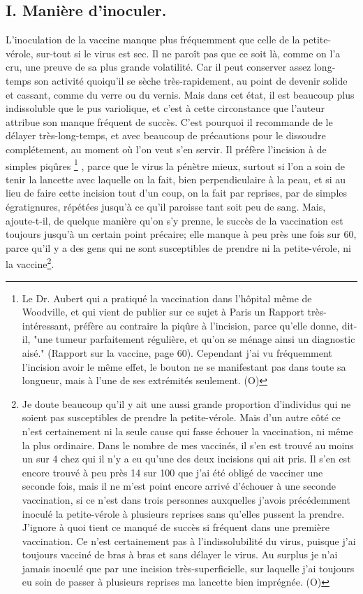 \subsection{I. Manière d'inoculer.}
L'inoculation de la vaccine manque plus fréquemment que celle de la petite-vérole, sur-tout si le virus est sec. Il ne paroît pas que ce soit là, comme on l'a cru, une preuve de sa plus grande volatilité. Car il peut conserver assez long-temps son activité quoiqu'il se sèche très-rapidement, au point de devenir solide et cassant, comme du verre ou du vernis. Mais dans cet état, il est beaucoup plus indissoluble que le pus variolique, et c'est à cette circonstance que l'auteur attribue\setcounter{page}{355} son manque fréquent de succès. C'est pourquoi il recommande de le délayer très-long-temps, et avec beaucoup de précautions pour le dissoudre complétement, au moment où l'on veut s'en servir. Il préfère l'incision à de simples piqûres \footnote{Le Dr. Aubert qui a pratiqué la vaccination dans l'hôpital même de Woodville, et qui vient de publier sur ce sujet à Paris un Rapport très-intéressant, préfère au contraire la piqûre à l'incision, parce qu'elle donne, dit-il, "une tumeur parfaitement régulière, et qu'on se ménage ainsi un diagnostic aisé." (Rapport sur la vaccine, page 60). Cependant j'ai vu fréquemment l'incision avoir le même effet, le bouton ne se manifestant pas dans toute sa longueur, mais à l'une de ses extrémités seulement. (O)} , parce que le virus la pénètre mieux, surtout si l'on a soin de tenir la lancette avec laquelle on la fait, bien perpendiculaire à la peau, et si au lieu de faire cette incision tout d'un coup, on la fait par reprises, par de simples égratignures, répétées jusqu'à ce qu'il paroisse tant soit peu de sang.
Mais, ajoute-t-il, de quelque manière qu'on s'y prenne, le succès de la vaccination est toujours jusqu'à un certain point précaire; elle manque à peu près une fois sur 60, parce qu'il y a des gens qui ne sont susceptibles\setcounter{page}{356} de prendre ni la petite-vérole, ni la vaccine\footnote{Je doute beaucoup qu'il y ait une aussi grande proportion d'individus qui ne soient pas susceptibles de prendre la petite-vérole. Mais d'un autre côté ce n'est certainement ni la seule cause qui fasse échouer la vaccination, ni même la plus ordinaire. Dans le nombre de mes vaccinés, il s'en est trouvé au moins un sur 4 chez qui il n'y a eu qu'une des deux incisions qui ait pris. Il s'en est encore trouvé à peu près 14 sur 100 que j'ai été obligé de vacciner une seconde fois, mais il ne m'est point encore arrivé d'échouer à une seconde vaccination, si ce n'est dans trois personnes auxquelles j'avois précédemment inoculé la petite-vérole à plusieurs reprises sans qu'elles pussent la prendre. J'ignore à quoi tient ce manqué de succès si fréquent dans une première vaccination. Ce n'est certainement pas à l'indissolubilité du virus, puisque j'ai toujours vacciné de bras à bras et sans délayer le virus. Au surplus je n'ai jamais inoculé que par une incision très-superficielle, sur laquelle j'ai toujours eu soin de passer à plusieurs reprises ma lancette bien imprégnée. (O)}.
